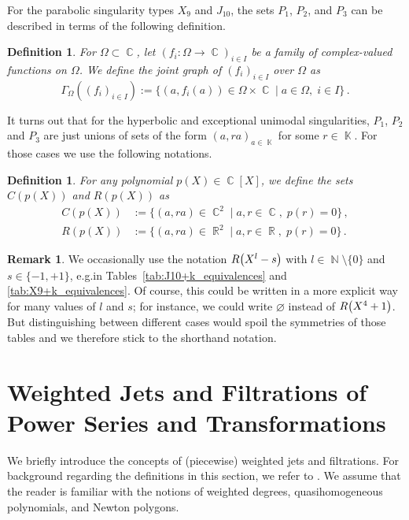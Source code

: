 \documentclass[noend]{amsproc}
\newtheorem{defn}[theorem]{Definition}
\theoremstyle{definition}
\newtheorem{remark}[theorem]{Remark}
\let\originalleft\left
\let\originalright\right
\renewcommand{\left}{\mathopen{}\mathclose\bgroup\originalleft}
\renewcommand{\right}{\aftergroup\egroup\originalright}
\DeclareMathOperator{\N}{\mathbb{N}}
\DeclareMathOperator{\R}{\mathbb{R}}
\DeclareMathOperator{\C}{\mathbb{C}}
\DeclareMathOperator{\K}{\mathbb{K}}
\begin{document}
For the parabolic singularity types $X_9$ and $J_{10}$, the sets $P_1$, $P_2$,
and $P_3$ can be described in terms of the following definition.

\begin{defn}
For $\Omega \subset \C$, let $(f_i: \Omega \rightarrow \C)_{i \in I}$ be a
family of complex-valued functions on $\Omega$. We define the joint graph of
$(f_i)_{i \in I}$ over $\Omega$ as
\[
\Gamma_\Omega((f_i)_{i \in I})
:= \{ (a, f_i(a)) \in \Omega \times \C \mid a\in \Omega,\; i \in I \}\,.
\]
\end{defn}

It turns out that for the hyperbolic and exceptional unimodal singularities,
$P_1$, $P_2$ and $P_3$ are just unions of sets of the form $(a, ra)_{a \in \K}$
for some $r \in \K$. For those cases we use the following notations.

\begin{defn}\label{def:C_R}
For any polynomial $p(X) \in \C[X]$, we define the sets $C(p(X))$ and $R(p(X))$
as
\begin{align*}
C(p(X)) &:= \{ (a, ra) \in \C^2 \mid a, r \in \C, \; p(r) = 0 \} \,, \\
R(p(X)) &:= \{ (a, ra) \in \R^2 \mid a, r \in \R, \; p(r) = 0 \} \,.
\end{align*}
\end{defn}

\begin{remark}
We occasionally use the notation $R\left(X^l-s\right)$ with
$l \in \N \setminus \{0\}$ and $s \in \{-1, +1\}$, e.g.\@ in
Tables~\ref{tab:J10+k_equivalences} and \ref{tab:X9+k_equivalences}. Of course,
this could be written in a more explicit way for many values of $l$ and $s$;
for instance, we could write $\varnothing$ instead of $R\left(X^4+1\right)$.
But distinguishing between different cases would spoil the symmetries of those
tables and we therefore stick to the shorthand notation.
\end{remark}


\section{Weighted Jets and Filtrations of Power Series and Transformations}%
\label{sec:weights}

We briefly introduce the concepts of (piecewise) weighted jets and filtrations.
For background regarding the definitions in this section, we refer to
\citet{A1974}. We assume that the reader is familiar with the notions of
weighted degrees, quasihomogeneous polynomials, and Newton polygons.
\end{document}
